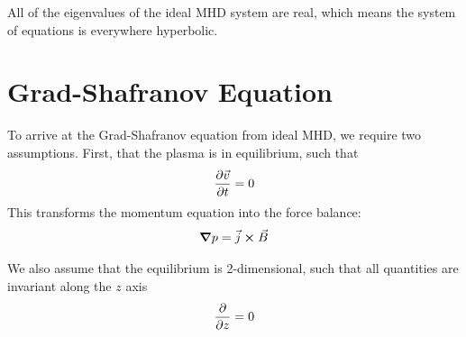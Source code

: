 \documentclass[%
 reprint,
 amsmath,amssymb,
 aps,
]{revtex4-2}
\begin{document}
All of the eigenvalues of the ideal MHD system are real, which means the system of equations is everywhere hyperbolic.

\section{Grad-Shafranov Equation}

To arrive at the Grad-Shafranov equation from ideal MHD, we require two assumptions. First, that the plasma is in equilibrium, such that
\begin{equation}
\pdv{\vec v}{t} = 0
\end{equation}
This transforms the momentum equation into the force balance:
\begin{equation}
\grad p = \vec j \cross \vec B
\end{equation}

We also assume that the equilibrium is 2-dimensional, such that all quantities are invariant along the $z$ axis
\begin{equation}
\pdv{}{z} = 0
\end{equation}
\end{document}
